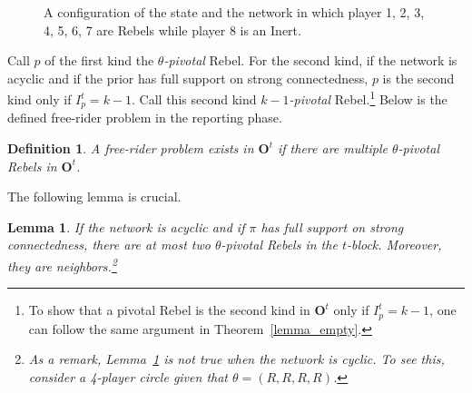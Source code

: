 \documentclass[12pt,letter]{article}
\newcommand{\Omicron}{\mathbf{O}}
\newtheorem{lemma}{Lemma}[section]
\newtheorem{definition}{Definition}[section]
\theoremstyle{definition}
\theoremstyle{remark}
\theoremstyle{claim}
\begin{document}
\begin{figure}


\begin{center}
\end{center}
\caption{A configuration of the state and the network in which player 1, 2, 3, 4, 5, 6, 7 are Rebels while player 8 is an Inert.}
\label{fig:k-1_pivotal}
\end{figure}

Call $p$ of the first kind the \textit{$\theta$-pivotal} Rebel. For the second kind, if the network is acyclic and if the prior has full support on strong connectedness, $p$ is the second kind only if $I^{t}_p=k-1$. Call this second kind \textit{$k-1$-pivotal} Rebel.\footnote{To show that a pivotal Rebel is the second kind in $\Omicron^{t}$ only if $I^{t}_p=k-1$, one can follow the same argument in Theorem~\ref{lemma_empty}.} Below is the defined free-rider problem in the reporting phase.

\begin{definition}
A free-rider problem exists in $\Omicron^t$ if there are multiple $\theta$-pivotal Rebels in $\Omicron^t$.
\end{definition}



The following lemma is crucial. 
\begin{lemma}
\label{lemma_at_most_two_nodes}
If the network is acyclic and if $\pi$ has full support on strong connectedness, there are at most two $\theta$-pivotal Rebels in the $t$-block. Moreover, they are neighbors.\footnote{As a remark, Lemma~\ref{lemma_at_most_two_nodes} is not true when the network is cyclic. To see this, consider a 4-player circle given that $\theta=(R,R,R,R)$.}
\end{lemma}
\end{document}
